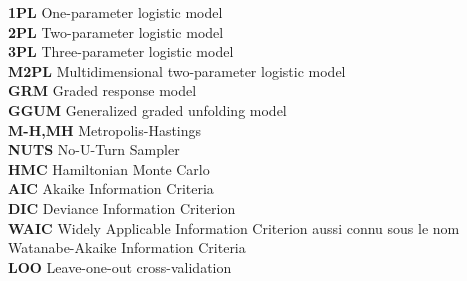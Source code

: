 \textbf{1PL}\hspace{0.5cm}  One-parameter logistic model\\
\textbf{2PL}\hspace{0.5cm}  Two-parameter logistic model\\
\textbf{3PL}\hspace{0.5cm}  Three-parameter logistic model\\
\textbf{M2PL}\hspace{0.5cm}  Multidimensional two-parameter logistic model\\
\textbf{GRM}\hspace{0.5cm}  Graded response model\\
\textbf{GGUM}\hspace{0.5cm}  Generalized graded unfolding model\\
\textbf{M-H,MH }\hspace{0.5cm}  Metropolis-Hastings\\
\textbf{NUTS}\hspace{0.5cm}  No-U-Turn Sampler\\
\textbf{HMC}\hspace{0.5cm}  Hamiltonian Monte Carlo\\
\textbf{AIC}\hspace{0.5cm} Akaike Information Criteria\\
\textbf{DIC}\hspace{0.5cm} Deviance Information Criterion\\
\textbf{WAIC}\hspace{0.5cm} Widely Applicable Information Criterion aussi connu sous le nom Watanabe-Akaike Information Criteria\\
\textbf{LOO}\hspace{0.5cm}  Leave-one-out cross-validation\\















